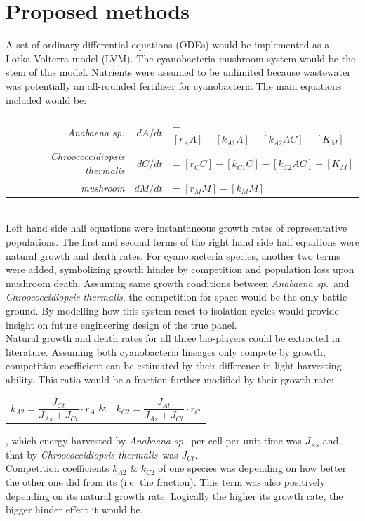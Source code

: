 \documentclass[a4paper, 11pt]{article}
\newcommand{\As}{\textit{Anabaena sp.}}
\newcommand{\Ct}{\textit{Chroococcidiopsis thermalis}}
\begin{document}
\section{Proposed methods}
A set of ordinary differential equations (ODEs) would be implemented as a Lotka-Volterra model (LVM).  The cyanobacteria-mushroom system \autocite{joshi2018bacterial} would be the stem of this model.  Nutrients were assumed to be unlimited because wastewater was potentially an all-rounded fertilizer for cyanobacteria \autocite{markou2014microalgal}  The main equations included would be:\\
\begin{tabular}{r|rl}
	\As						&$dA/dt$	&= $[r_A A] - [k_{A1} A] - [k_{A2} A C] - [K_M]$\\
	\Ct						&$dC/dt$	&= $[r_C C] - [k_{C1} C] - [k_{C2} A C] - [K_M]$\\
	\textit{mushroom}		&$dM/dt$	&= $[r_M M] - [k_M M]$\\
\end{tabular}\\
Left hand side half equations were instantaneous growth rates of representative populations.  The first and second terms of the right hand side half equations were natural growth and death rates.  For cyanobacteria species, another two terms were added, symbolizing growth hinder by competition and population loss upon mushroom death.  Assuming same growth conditions between \As\ and \Ct, the competition for space would be the only battle ground.  By modelling how this system react to isolation cycles would provide insight on future engineering design of the true panel.\\
Natural growth and death rates for all three bio-players could be extracted in literature.  Assuming both cyanobacteria lineages only compete by growth, competition coefficient can be estimated by their difference in light harvesting ability.  This ratio would be a fraction further modified by their growth rate:
\begin{tabular}{cc}
	$k_{A2} = \dfrac{J_{Ct}}{J_{As} + J_{Ct}}\cdot r_A$ \&& $k_{C2} = \dfrac{J_{At}}{J_{As} + J_{Ct}}\cdot r_C$
\end{tabular}, which energy harvested by \As\ per cell per unit time was $J_{As}$ and that by \Ct\ was $J_{Ct}$.\\
Competition coefficients $k_{A2}$ \& $k_{C2}$ of one species was depending on how better the other one did from its (i.e. the fraction).  This term was also positively depending on its natural growth rate.  Logically the higher its growth rate, the bigger hinder effect it would be.\\
\end{document}
